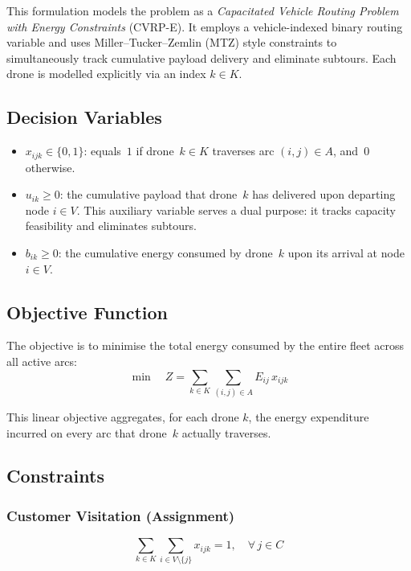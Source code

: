\documentclass[11pt,a4paper]{article}
\begin{document}
This formulation models the problem as a \emph{Capacitated Vehicle Routing Problem with Energy Constraints} (CVRP-E). It employs a vehicle-indexed binary routing variable and uses Miller--Tucker--Zemlin (MTZ) style constraints to simultaneously track cumulative payload delivery and eliminate subtours. Each drone is modelled explicitly via an index $k \in K$.

\subsection{Decision Variables}
\begin{itemize}
  \item $x_{ijk} \in \{0, 1\}$: equals~$1$ if drone~$k \in K$ traverses arc $(i,j) \in A$, and~$0$ otherwise.
  \item $u_{ik} \ge 0$: the cumulative payload that drone~$k$ has delivered upon departing node $i \in V$. This auxiliary variable serves a dual purpose: it tracks capacity feasibility and eliminates subtours.
  \item $b_{ik} \ge 0$: the cumulative energy consumed by drone~$k$ upon its arrival at node $i \in V$.
\end{itemize}

\subsection{Objective Function}

The objective is to minimise the total energy consumed by the entire fleet across all active arcs:
\begin{equation}
  \min \quad Z = \sum_{k \in K} \sum_{(i,j) \in A} E_{ij} \, x_{ijk}
  \label{eq:f1_obj}
\end{equation}

This linear objective aggregates, for each drone $k$, the energy expenditure incurred on every arc that drone~$k$ actually traverses.

\subsection{Constraints}

\subsubsection{Customer Visitation (Assignment)}
\begin{equation}
  \sum_{k \in K} \sum_{i \in V \setminus \{j\}} x_{ijk} = 1, \quad \forall\, j \in C
  \label{eq:f1_visit}
\end{equation}
\end{document}

